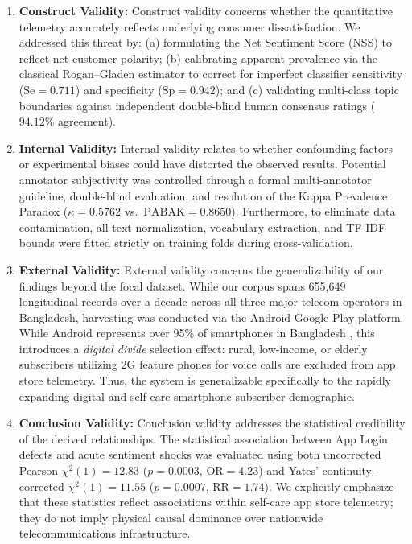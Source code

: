 \documentclass[review,12pt,authoryear]{elsarticle}
\begin{document}
\begin{enumerate}
    \item \textbf{Construct Validity:} Construct validity concerns whether the quantitative telemetry accurately reflects underlying consumer dissatisfaction. We addressed this threat by: (a) formulating the Net Sentiment Score (NSS) to reflect net customer polarity; (b) calibrating apparent prevalence via the classical Rogan--Gladen estimator to correct for imperfect classifier sensitivity ($\mathrm{Se} = 0.711$) and specificity ($\mathrm{Sp} = 0.942$); and (c) validating multi-class topic boundaries against independent double-blind human consensus ratings ($94.12\%$ agreement).
    
    \item \textbf{Internal Validity:} Internal validity relates to whether confounding factors or experimental biases could have distorted the observed results. Potential annotator subjectivity was controlled through a formal multi-annotator guideline, double-blind evaluation, and resolution of the Kappa Prevalence Paradox ($\kappa = 0.5762$ vs.\ $\text{PABAK} = 0.8650$). Furthermore, to eliminate data contamination, all text normalization, vocabulary extraction, and TF-IDF bounds were fitted strictly on training folds during cross-validation.
    
    \item \textbf{External Validity:} External validity concerns the generalizability of our findings beyond the focal dataset. While our corpus spans 655,649 longitudinal records over a decade across all three major telecom operators in Bangladesh, harvesting was conducted via the Android Google Play platform. While Android represents over 95\% of smartphones in Bangladesh \citep{btrc2026quarterly}, this introduces a \textit{digital divide} selection effect: rural, low-income, or elderly subscribers utilizing 2G feature phones for voice calls are excluded from app store telemetry. Thus, the system is generalizable specifically to the rapidly expanding digital and self-care smartphone subscriber demographic.
    
    \item \textbf{Conclusion Validity:} Conclusion validity addresses the statistical credibility of the derived relationships. The statistical association between App Login defects and acute sentiment shocks was evaluated using both uncorrected Pearson $\chi^2(1) = 12.83$ ($p = 0.0003$, $\text{OR} = 4.23$) and Yates' continuity-corrected $\chi^2(1) = 11.55$ ($p = 0.0007$, $\text{RR} = 1.74$). We explicitly emphasize that these statistics reflect associations within self-care app store telemetry; they do not imply physical causal dominance over nationwide telecommunications infrastructure.
\end{enumerate}
\end{document}
